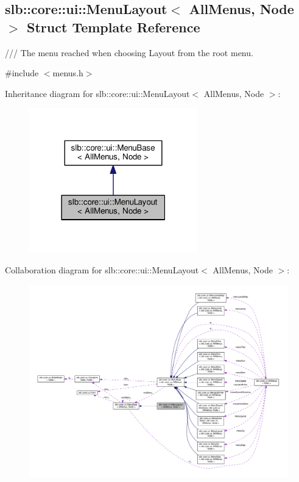 \hypertarget{structslb_1_1core_1_1ui_1_1MenuLayout}{}\subsection{slb\+:\+:core\+:\+:ui\+:\+:Menu\+Layout$<$ All\+Menus, Node $>$ Struct Template Reference}
\label{structslb_1_1core_1_1ui_1_1MenuLayout}


/// The menu reached when choosing Layout from the root menu.  




{\ttfamily \#include $<$menus.\+h$>$}



Inheritance diagram for slb\+:\+:core\+:\+:ui\+:\+:Menu\+Layout$<$ All\+Menus, Node $>$\+:\nopagebreak
\begin{figure}[H]
\begin{center}
\leavevmode
\includegraphics[width=207pt]{structslb_1_1core_1_1ui_1_1MenuLayout__inherit__graph}
\end{center}
\end{figure}


Collaboration diagram for slb\+:\+:core\+:\+:ui\+:\+:Menu\+Layout$<$ All\+Menus, Node $>$\+:\nopagebreak
\begin{figure}[H]
\begin{center}
\leavevmode
\includegraphics[width=350pt]{structslb_1_1core_1_1ui_1_1MenuLayout__coll__graph}
\end{center}
\end{figure}
